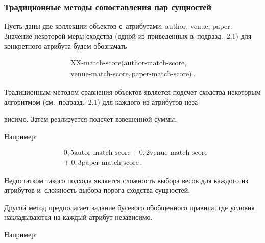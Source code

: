\begin{multicols}{2}
  \subsubsection{Традиционные методы сопоставления пар сущностей}

  Пусть даны две коллекции объектов с~атрибутами: author, venue, paper. Значение
некоторой меры сходства (одной из приведенных в~подразд.~2.1) для конкретного атрибута
будем обозначать

\vspace*{-3pt}

\noindent
\begin{multline*}
\mathrm{XX}\mbox{-}\mathrm{match}\mbox{-}\mathrm{score}
(\mathrm{author}\mbox{-}\mathrm{match}\mbox{-}\mathrm{score},\\
  \mathrm{venue}\mbox{-}\mathrm{match}\mbox{-}\mathrm{score},
  \mathrm{paper}\mbox{-}\mathrm{match}\mbox{-}\mathrm{score})\,.
\end{multline*}

\vspace*{-3pt}

  Традиционным методом сравнения объектов является подсчет сходства некоторым
алгоритмом (см.\ подразд.~2.1) для каждого из атрибутов неза-\linebreak\vspace*{-12pt}

\columnbreak

\noindent
висимо. Затем реализуется подсчет
взвешенной суммы.

  Например:

  \vspace*{-4pt}

  \noindent
  \begin{align*}
 & 0{,}5  \mathrm{autor}\mbox{-}\mathrm{match}\mbox{-}\mathrm{score}+
  0{,}2\mathrm{venue}\mbox{-}\mathrm{match}\mbox{-}\mathrm{score}\\
&  +\;  0{,}3\mathrm{paper}\mbox{-}\mathrm{match}\mbox{-}\mathrm{score}\,.
  \end{align*}

  \vspace*{-4pt}

  Недостатком такого подхода является сложность выбора весов для каждого из атрибутов
и~сложность выбора порога сходства сущностей.

  Другой метод предполагает задание булевого обобщенного правила, где условия
накладываются на каждый атрибут независимо.

  Например:


\end{multicols}
